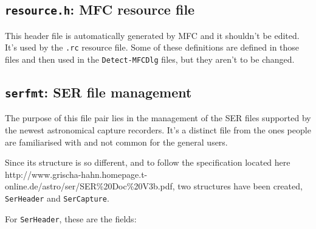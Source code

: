 \documentclass[a4paper,11pt]{memoir}
\begin{document}
\subsection{\texttt{resource.h}: MFC resource file}

This header file is automatically generated by MFC and it shouldn’t be edited. It’s used by the \texttt{.rc} resource file. Some of these definitions are defined in those files and then used in the \texttt{Detect-MFCDlg} files, but they aren’t to be changed.

\subsection{\texttt{serfmt}: SER file management}

The purpose of this file pair lies in the management of the SER files supported by the newest astronomical capture recorders. It’s a distinct file from the ones people are familiarised with and not common for the general users.

Since its structure is so different, and to follow the specification located here http://www.grischa-hahn.homepage.t-online.de/astro/ser/SER\%20Doc\%20V3b.pdf, two structures have been created, \texttt{SerHeader} and \texttt{SerCapture}.

For \texttt{SerHeader}, these are the fields:
\end{document}
